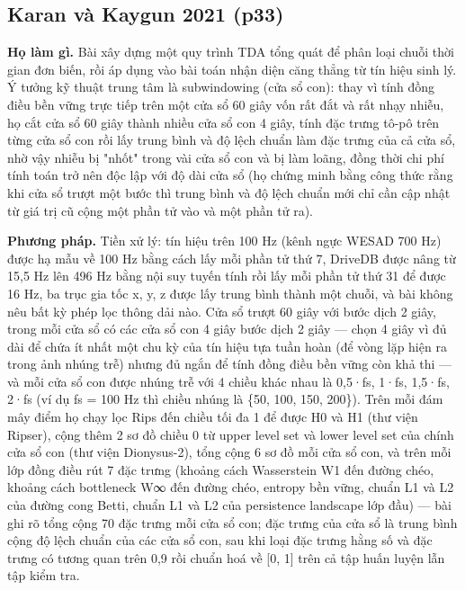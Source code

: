\documentclass[12pt,a4paper]{article}
\begin{document}
\subsection{Karan và Kaygun 2021 \normalfont\small (p33)}
\par\vspace{2pt}
\par\vspace{4pt}
\noindent \textbf{Họ làm gì.} Bài xây dựng một quy trình TDA tổng quát để phân loại chuỗi thời gian đơn biến, rồi áp dụng vào bài toán nhận diện căng thẳng từ tín hiệu sinh lý. Ý tưởng kỹ thuật trung tâm là subwindowing (cửa sổ con): thay vì tính đồng điều bền vững trực tiếp trên một cửa sổ 60 giây vốn rất đắt và rất nhạy nhiễu, họ cắt cửa sổ 60 giây thành nhiều cửa sổ con 4 giây, tính đặc trưng tô-pô trên từng cửa sổ con rồi lấy trung bình và độ lệch chuẩn làm đặc trưng của cả cửa sổ, nhờ vậy nhiễu bị "nhốt" trong vài cửa sổ con và bị làm loãng, đồng thời chi phí tính toán trở nên độc lập với độ dài cửa sổ (họ chứng minh bằng công thức rằng khi cửa sổ trượt một bước thì trung bình và độ lệch chuẩn mới chỉ cần cập nhật từ giá trị cũ cộng một phần tử vào và một phần tử ra).\par\vspace{3pt}
\noindent \textbf{Phương pháp.} Tiền xử lý: tín hiệu trên 100 Hz (kênh ngực WESAD 700 Hz) được hạ mẫu về 100 Hz bằng cách lấy mỗi phần tử thứ 7, DriveDB được nâng từ 15,5 Hz lên 496 Hz bằng nội suy tuyến tính rồi lấy mỗi phần tử thứ 31 để được 16 Hz, ba trục gia tốc x, y, z được lấy trung bình thành một chuỗi, và bài không nêu bất kỳ phép lọc thông dải nào. Cửa sổ trượt 60 giây với bước dịch 2 giây, trong mỗi cửa sổ có các cửa sổ con 4 giây bước dịch 2 giây — chọn 4 giây vì đủ dài để chứa ít nhất một chu kỳ của tín hiệu tựa tuần hoàn (để vòng lặp hiện ra trong ảnh nhúng trễ) nhưng đủ ngắn để tính đồng điều bền vững còn khả thi — và mỗi cửa sổ con được nhúng trễ với 4 chiều khác nhau là 0,5·fs, 1·fs, 1,5·fs, 2·fs (ví dụ fs = 100 Hz thì chiều nhúng là \{50, 100, 150, 200\}). Trên mỗi đám mây điểm họ chạy lọc Rips đến chiều tối đa 1 để được H0 và H1 (thư viện Ripser), cộng thêm 2 sơ đồ chiều 0 từ upper level set và lower level set của chính cửa sổ con (thư viện Dionysus-2), tổng cộng 6 sơ đồ mỗi cửa sổ con, và trên mỗi lớp đồng điều rút 7 đặc trưng (khoảng cách Wasserstein W1 đến đường chéo, khoảng cách bottleneck W∞ đến đường chéo, entropy bền vững, chuẩn L1 và L2 của đường cong Betti, chuẩn L1 và L2 của persistence landscape lớp đầu) — bài ghi rõ tổng cộng 70 đặc trưng mỗi cửa sổ con; đặc trưng của cửa sổ là trung bình cộng độ lệch chuẩn của các cửa sổ con, sau khi loại đặc trưng hằng số và đặc trưng có tương quan trên 0,9 rồi chuẩn hoá về [0, 1] trên cả tập huấn luyện lẫn tập kiểm tra.\par\vspace{3pt}
\end{document}
